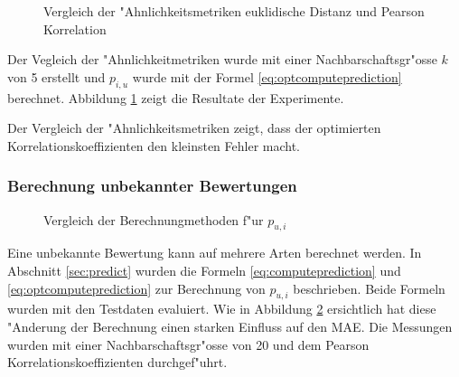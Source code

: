 \documentclass[a4paper, 12pt]{article}
\begin{document}
\begin{figure}
\centering
\caption{Vergleich der "Ahnlichkeitsmetriken euklidische Distanz und Pearson Korrelation}
\label{fig:comparesim1}
\end{figure}

Der Vegleich der "Ahnlichkeitmetriken wurde mit einer Nachbarschaftsgr"osse $k$ von 5 erstellt und $p_{i,u}$ wurde mit der Formel \ref{eq:optcomputeprediction} berechnet. Abbildung \ref{fig:comparesim1} zeigt die Resultate der Experimente.

Der Vergleich der "Ahnlichkeitsmetriken zeigt, dass der optimierten Korrelationskoeffizienten den kleinsten Fehler macht.


\subsubsection{Berechnung unbekannter Bewertungen}
\label{sec:eqpredictresults}

\begin{figure}
\centering
\caption{Vergleich der Berechnungmethoden f"ur $p_{u,i}$}
\label{fig:predicteq}
\end{figure}

Eine unbekannte Bewertung kann auf mehrere Arten berechnet werden. In Abschnitt \ref{sec:predict} wurden die Formeln \ref{eq:computeprediction} und \ref{eq:optcomputeprediction} zur Berechnung  von $p_{u,i}$ beschrieben. Beide Formeln wurden mit den Testdaten evaluiert. Wie in Abbildung \ref{fig:predicteq} ersichtlich hat diese "Anderung der Berechnung einen starken Einfluss auf den MAE. Die Messungen wurden mit einer Nachbarschaftsgr"osse von 20 und dem Pearson Korrelationskoeffizienten durchgef"uhrt.
\end{document}
